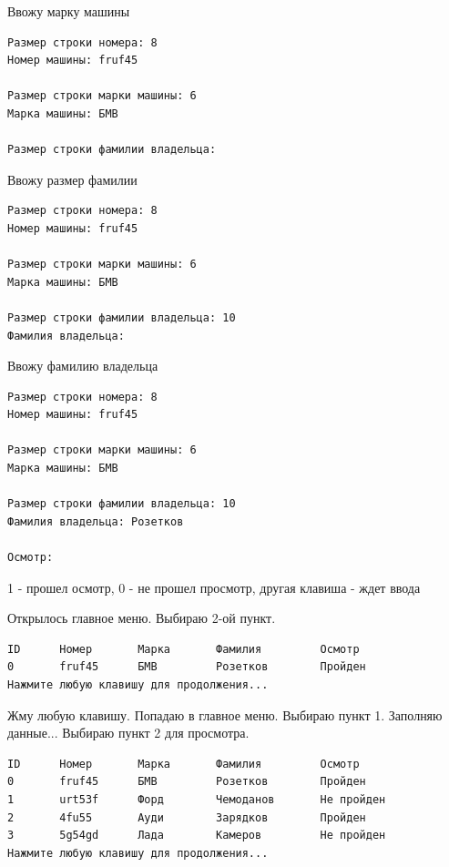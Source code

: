 \documentclass[12pt, a4paper]{article}
\begin{document}
Ввожу марку машины

\begin{tcolorbox}
\begin{verbatim}
Размер строки номера: 8
Номер машины: fruf45

Размер строки марки машины: 6
Марка машины: БМВ

Размер строки фамилии владельца: 
\end{verbatim}
\end{tcolorbox}

Ввожу размер фамилии

\begin{tcolorbox}
\begin{verbatim}
Размер строки номера: 8
Номер машины: fruf45

Размер строки марки машины: 6
Марка машины: БМВ

Размер строки фамилии владельца: 10
Фамилия владельца:
\end{verbatim}
\end{tcolorbox}

Ввожу фамилию владельца

\begin{tcolorbox}
\begin{verbatim}
Размер строки номера: 8
Номер машины: fruf45

Размер строки марки машины: 6
Марка машины: БМВ

Размер строки фамилии владельца: 10
Фамилия владельца: Розетков

Осмотр: 
\end{verbatim}
\end{tcolorbox}

1 - прошел осмотр, 0 - не прошел просмотр, другая клавиша - ждет ввода

Открылось главное меню. Выбираю 2-ой пункт.

\begin{tcolorbox}
\begin{verbatim}
ID      Номер       Марка       Фамилия         Осмотр
0       fruf45      БМВ         Розетков        Пройден
Нажмите любую клавишу для продолжения...
\end{verbatim}
\end{tcolorbox}

Жму любую клавишу. Попадаю в главное меню. Выбираю пункт 1. Заполняю данные... Выбираю пункт 2 для просмотра.

\begin{tcolorbox}
\begin{verbatim}
ID      Номер       Марка       Фамилия         Осмотр
0       fruf45      БМВ         Розетков        Пройден
1       urt53f      Форд        Чемоданов       Не пройден
2       4fu55       Ауди        Зарядков        Пройден
3       5g54gd      Лада        Камеров         Не пройден
Нажмите любую клавишу для продолжения...   
\end{verbatim}
\end{tcolorbox}
\end{document}
